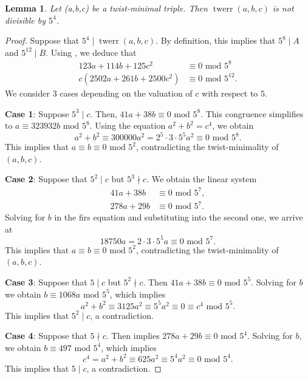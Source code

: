 \documentclass[12pt]{amsart}
\newcounter{counter}[section] %
\numberwithin{equation}{section} %
\newtheorem{lemma}[counter]{Lemma}
\theoremstyle{definition} \newtheorem{definition}[counter]{Definition}
\theoremstyle{remark} \newtheorem{nonexam}[counter]{Non-example}
\newcommand{\md}{\text{ mod }} %
\DeclareMathOperator{\twerr}{twerr} %
\begin{document}
\begin{lemma} \label{lemma:625-nmid-twerr}
    Let (a,b,c) be a twist-minimal triple. Then $\twerr(a,b,c)$ is not divisible by $5^4$.
\end{lemma}
\begin{proof}
    Suppose that $5^4 \mid \twerr(a,b,c)$. By definition, this implies that $5^8 \mid A$ and $5^{12} \mid B$. Using , we deduce that
    \begin{align*}
        123a + 114b + 125c^2 &\equiv 0 \text{ mod } 5^8 \\
        c(2502a + 261b + 2500c^2) &\equiv 0 \text{ mod } 5^{12}.
    \end{align*}
    We consider 3 cases depending on the valuation of $c$ with respect to $5$.

    \medskip \textbf{Case 1}: Suppose $5^3 \mid c$. Then,
    $41 a + 38b \equiv 0 \md 5^8$. This congruence simplifies to
    $a \equiv 323932b \md 5^8$. Using the equation $a^2 + b^2 = c^4$, we obtain
    \begin{equation*}
        a^2 + b^2 \equiv 300000a^2 = 2^5 \cdot 3 \cdot 5^5 a^2 \equiv 0 \md 5^8.
    \end{equation*}
    This implies that $a \equiv b \equiv 0 \text{ mod } 5^2$, contradicting
    the twist-minimality of $(a,b,c)$.

    \medskip 
    \textbf{Case 2}: Suppose that $5^2 \mid c$ but $5^3 \nmid c$. We obtain the
    linear system
    \begin{align*}
        41a + 38b &\equiv 0 \md 5^7, \\
        278a + 29b &\equiv 0 \md 5^7.
    \end{align*}
    Solving for $b$ in the firs equation and substituting into the second one,
    we arrive at
    \begin{equation*}
        18750a = 2 \cdot 3 \cdot 5^5 a \equiv 0 \md 5^7.
    \end{equation*}
    This implies that $a \equiv b \equiv 0 \md 5^2$, contradicting
    the twist-minimality of $(a,b,c)$.

    \medskip \textbf{Case 3}: Suppose that $5 \mid c$ but $5^2 \nmid c$. Then
    $41a + 38b \equiv 0 \md 5^5$. Solving for $b$ we obtain
    $b \equiv 1068a \md5^5$, which implies
    \begin{equation*}
        a^2 + b^2 \equiv 3125 a^2 \equiv 5^5 a^2 \equiv 0 \equiv c^4 \text{ mod } 5^5.
    \end{equation*}
    This implies that $5^2 \mid c$, a contradiction.

    \medskip \textbf{Case 4}: Suppose that $5 \nmid c$. Then 
    implies $278a + 29b \equiv 0 \text{ mod } 5^4$. Solving for $b$, we obtain
    $b \equiv 497 \md 5^4$, which implies
    \begin{equation*}
       c^4 = a^2 + b^2 \equiv 625 a^2 \equiv 5^4 a^2 \equiv 0 \md5^4.
    \end{equation*}
    This implies that $5 \mid c$, a contradiction.
\end{proof}
\end{document}

